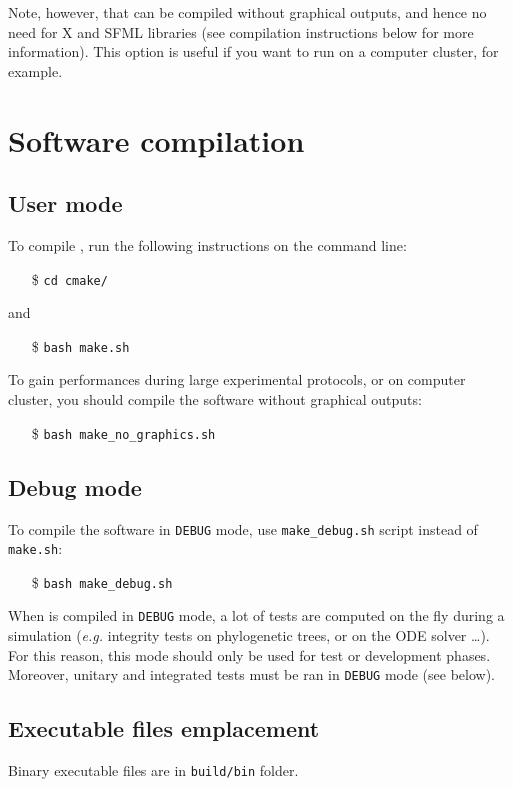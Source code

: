 Note, however, that {\packageName} can be compiled without graphical outputs, and hence no need for X and SFML libraries (see compilation instructions below for more information). This option is useful if you want to run {\packageName} on a computer cluster, for example.

\section{Software compilation}

\subsection{User mode}
To compile {\packageName}, run the following instructions on the command line:
\begin{itemize}
	\item[\$] \texttt{cd cmake/}
\end{itemize}
and
\begin{itemize}
	\item[\$] \texttt{bash make.sh}
\end{itemize}

To gain performances during large experimental protocols, or on computer cluster, you should compile the software without graphical outputs:
\begin{itemize}
	\item[\$] \texttt{bash make\_no\_graphics.sh}
\end{itemize}

\subsection{Debug mode}
To compile the software in \texttt{DEBUG} mode, use \texttt{make\_debug.sh} script instead of \texttt{make.sh}:
\begin{itemize}
	\item[\$] \texttt{bash make\_debug.sh}
\end{itemize}
When {\packageName} is compiled in \texttt{DEBUG} mode, a lot of tests are computed on the fly during a simulation (\textit{e.g.} integrity tests on phylogenetic trees, or on the ODE solver \ldots). For this reason, this mode should only be used for test or development phases. Moreover, unitary and integrated tests must be ran in \texttt{DEBUG} mode (see below).

\subsection{Executable files emplacement}
Binary executable files are in \texttt{build/bin} folder.
